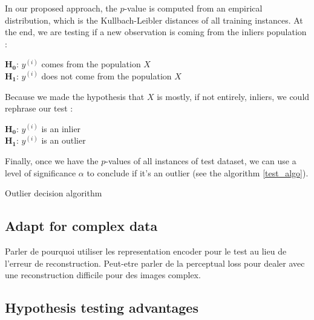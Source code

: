 \documentclass{article}
\begin{document}
In our proposed approach, the $p$-value is computed from an empirical distribution, which is the Kullbach-Leibler distances of all training instances. At the end, we are testing if a new observation is coming from the inliers population :

\begin{center}
$\boldsymbol{H_0}$: $y^{(i)}$ comes from the population $X$ \\
$\boldsymbol{H_1}$: $y^{(i)}$ does not come from the population $X$
\end{center}

\noindent Because we made the hypothesis that $X$ is mostly, if not entirely, inliers, we could rephrase our test :

\begin{center}
	$\boldsymbol{H_0}$: $y^{(i)}$ is an inlier \\
	$\boldsymbol{H_1}$: $y^{(i)}$ is an outlier
\end{center}

Finally, once we have the $p$-values of all instances of test dataset, we can use a level of significance $\alpha$ to conclude if it's an outlier (see the algorithm \ref{test_algo}).

\begin{center}
	\begin{algorithm}[H] \label{test_algo}
		\SetAlgoLined
		\caption{Outlier decision algorithm}
	\end{algorithm}
\end{center}

\subsection{Adapt for complex data}

Parler de pourquoi utiliser les representation encoder pour le test au lieu de l'erreur de reconstruction. Peut-etre parler de la perceptual loss pour dealer avec une reconstruction difficile pour des images complex.

\subsection{Hypothesis testing advantages}
\end{document}
